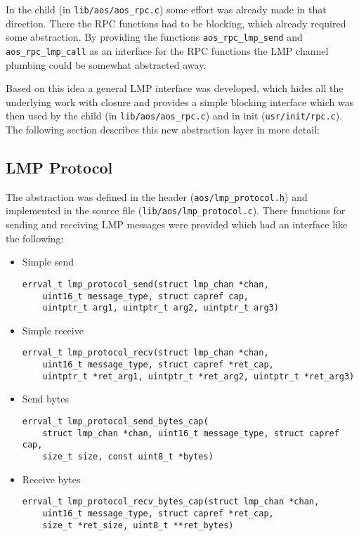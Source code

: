 In the child (in \verb|lib/aos/aos_rpc.c|) some effort was already made in that direction. There the RPC functions had to be blocking, which already required some abstraction. By providing the functions \verb|aos_rpc_lmp_send| and \verb|aos_rpc_lmp_call| as an interface for the RPC functions the LMP channel plumbing could be somewhat abstracted away.

Based on this idea a general LMP interface was developed, which hides all the underlying work with closure and provides a simple blocking interface which was then used by the child (in \verb|lib/aos/aos_rpc.c|) and in init (\verb|usr/init/rpc.c|). The following section describes this new abstraction layer in more detail:

\subsection{LMP Protocol}
\label{sec:lmp-protocol}
The abstraction was defined in the header (\verb|aos/lmp_protocol.h|) and implemented in the source file (\verb|lib/aos/lmp_protocol.c|). There functions for sending and receiving LMP messages were provided which had an interface like the following:
\begin{itemize}
    \item Simple send
    \begin{verbatim}errval_t lmp_protocol_send(struct lmp_chan *chan,
    uint16_t message_type, struct capref cap,
    uintptr_t arg1, uintptr_t arg2, uintptr_t arg3)\end{verbatim}
    \item Simple receive
    \begin{verbatim}errval_t lmp_protocol_recv(struct lmp_chan *chan,
    uint16_t message_type, struct capref *ret_cap,
    uintptr_t *ret_arg1, uintptr_t *ret_arg2, uintptr_t *ret_arg3)\end{verbatim}
    \item Send bytes
    \begin{verbatim}errval_t lmp_protocol_send_bytes_cap(
    struct lmp_chan *chan, uint16_t message_type, struct capref cap,
    size_t size, const uint8_t *bytes)\end{verbatim}
    \item Receive bytes
    \begin{verbatim}errval_t lmp_protocol_recv_bytes_cap(struct lmp_chan *chan,
    uint16_t message_type, struct capref *ret_cap,
    size_t *ret_size, uint8_t **ret_bytes)\end{verbatim}
\end{itemize}

